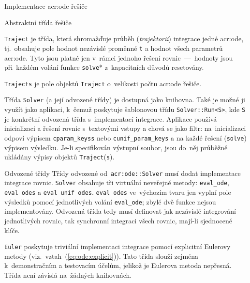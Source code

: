 \documentclass[thesis=M,czech]{FITthesis}[2012/06/26]
\newcommand{\acrlabel}[1]{acr:#1}
\newcommand{\acr}[1]{\acrshort{\acrlabel{#1}}}
\newcommand{\id}[1]{\texttt{#1}}
\newcommand{\hl}[1]{\textit{#1}}
\newcommand{\name}[1]{\hl{#1}}
\newcommand{\rf}[1]{\ref{#1}}
\newcommand{\rfeq}[1]{(\rf{eq:#1})}
\begin{document}
\begin{section}{Implementace \acr{ode} řešiče}
\begin{subsection}{Abstraktní třída řešiče}

\begin{paragraph}{\id{Traject}}\label{p:impl:ode:solver:op:traj}
je třída, která shromažďuje průběh (\name{trajektorii})
integrace jedné \acr{ode},
tj.~obsahuje pole hodnot nezávislé proměnné \id{t}
a hodnot všech parametrů \acr{ode}.
Tyto jsou platné jen v~rámci jednoho
řešení rovnic~---~hodnoty jsou při~každém volání funkce \id{solve}*
z~kapacitních důvodů resetovány.

\id{Trajects} je pole objektů \id{Traject} o~velikosti
počtu \acr{ode} řešiče.
\end{paragraph} %



\bigskip

Třída \id{Solver} (a její odvozené třídy) je dostupná jako knihovna.
Také je možné ji využít jako aplikaci,
k~čemuž poskytuje šablonovou třídu \id{Solver::\-Run<S>},
kde \id{S} je konkrétní odvozená třída s~implementací integrace.
Aplikace používá inicializaci a řešení rovnic
s~textovými vstupy a chová se jako filtr:
na~inicializaci odpoví výpisem
\id{cparam\_\-keyss} nebo \id{cunif\_\-param\_\-keys}
a na každé řešení (\id{solve}) výpisem výsledku.
Je-li specifikován výstupní soubor,
jsou do~něj průběžně ukládány
výpisy objektů \id{Traject}(\id{s}).
\end{subsection} %


\begin{subsection}{Odvozené třídy}
\label{ss:impl:ode:derived}
Třídy odvozené od~\id{\acr{ode}::\-Solver}
musí dodat implementace integrace rovnic.
\id{Solver} obsahuje tři virtuální neveřejné metody:
\id{eval\_\-ode}, \id{eval\_\-odes}
a \id{eval\_\-unif\_\-odes}.
\id{eval\_\-odes} ve~výchozím tvaru
jen vyplní pole výsledků pomocí
jednotlivých volání \id{eval\_\-ode};
zbylé dvě funkce nejsou implementovány.
Odvozená třída tedy musí definovat
jak nezávislé integrování jednotlivých rovnic,
tak synchronní integraci všech rovnic,
mají-li sjednocené klíče.


\begin{paragraph}{\id{Euler}}
\label{p:impl:ode:derived:euler}
poskytuje triviální implementaci integrace
pomocí explicitní Eulerovy metody
(viz.~vztah~\rfeq{ode:explicit}).
Tato třída slouží zejména k~demonstračním a testovacím účelům,
jelikož je Eulerova metoda nepřesná.
Třída není závislá na~žádných knihovnách.


\end{paragraph}
\end{subsection}
\end{section}
\end{document}
